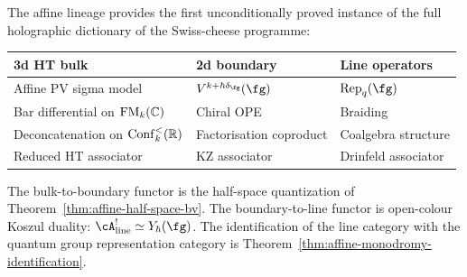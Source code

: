 \begin{corollary}
\label{cor:holographic-dictionary}
The affine lineage provides the first unconditionally proved instance of the full holographic dictionary of the Swiss-cheese programme:
\begin{center}
\renewcommand{\arraystretch}{1.3}
\begin{tabular}{lll}
\textbf{3d HT bulk} & \textbf{2d boundary} & \textbf{Line operators} \\
\hline
Affine PV sigma model & $V^{k+\hbar\delta_\fg}(\fg)$ & $\mathrm{Rep}_q(\fg)$ \\
Bar differential on $\mathrm{FM}_k(\mathbb C)$ & Chiral OPE & Braiding \\
Deconcatenation on $\mathrm{Conf}_k^<(\mathbb R)$ & Factorisation coproduct & Coalgebra structure \\
Reduced HT associator & KZ associator & Drinfeld associator \\
\end{tabular}
\end{center}
The bulk-to-boundary functor is the half-space quantization of Theorem~\textup{\ref{thm:affine-half-space-bv}}. The boundary-to-line functor is open-colour Koszul duality: $\cA^!_{\mathrm{line}} \simeq Y_\hbar(\fg)$. The identification of the line category with the quantum group representation category is Theorem~\textup{\ref{thm:affine-monodromy-identification}}.
\end{corollary}

